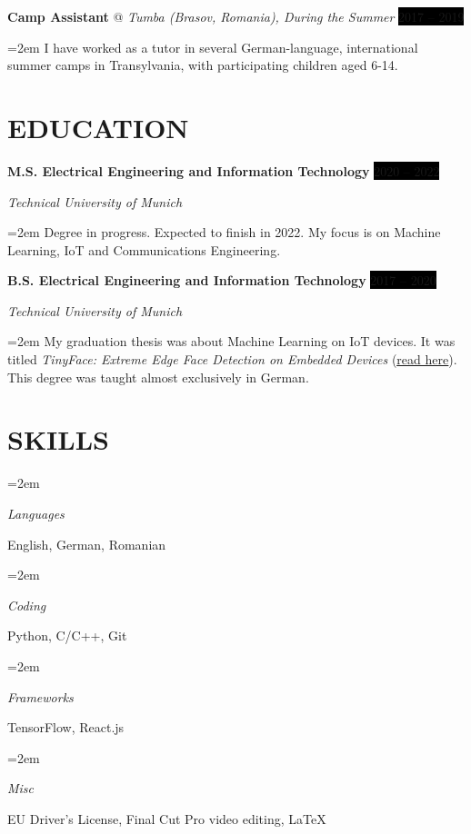 \documentclass[paper=a4,fontsize=11pt]{scrartcl}
\makeatletter
\newlength{\spacebox}
\newcommand{\sepspace}{\vspace*{0.45em}}		%
\newcommand{\NewPart}[1]{\section*{\uppercase{#1}}}
\newcommand{\PersonalEntry}[2]{
		\noindent\hangindent=2em\hangafter=0 %
		\parbox{\spacebox}{        %
		\textit{#1}}		       %
		\hspace{1.5em} #2 \par}    %
\newcommand{\SkillsEntry}[2]{      %
		\noindent\hangindent=2em\hangafter=0 %
		\parbox{\spacebox}{        %
		\textit{#1}}			   %
		\hspace{2.5em} #2 \par}    %
\newcommand{\EducationEntry}[4]{
		\noindent \textbf{#1} \hfill      %
		\colorbox{Black}{\color{White}#2} \par  %
		\noindent \textit{#3} \par        %
		\noindent\hangindent=2em\hangafter=0 \small #4 %
		\normalsize \par}
\newcommand{\WorkEntry}[4]{				  %
		\noindent \textbf{#1} @ \textit{#3} \hfill      %
		\colorbox{Black}{\color{White}#2} \par  %
		\noindent\hangindent=2em\hangafter=0 \small #4 %
		\normalsize \par}
\makeatother
\begin{document}
\WorkEntry{Camp Assistant}{2017 – 2019}{Tumba (Brasov, Romania), During the Summer}{I have worked as a tutor in several German-language, international summer camps in Transylvania, with participating children aged 6-14.}

\NewPart{Education}{}

\EducationEntry{M.S. Electrical Engineering and Information Technology}{2020 – 2022}{Technical University of Munich}{Degree in progress. Expected to finish in 2022. My focus is on Machine Learning, IoT and Communications Engineering.}
\sepspace

\EducationEntry{B.S. Electrical Engineering and Information Technology}{2017 – 2020}{Technical University of Munich}{My graduation thesis was about Machine Learning on IoT devices. It was titled \textit{TinyFace: Extreme Edge Face Detection on Embedded Devices} (\href{https://github.com/munober/thesis/blob/master/digital_edition.pdf}{\underline{read here}}). This degree was taught almost exclusively in German.}

\NewPart{Skills}{}

\SkillsEntry{Languages}{English, German, Romanian}
\SkillsEntry{Coding}{Python, \textsc{C/C++}, Git}
\SkillsEntry{Frameworks}{TensorFlow, React.js}
\SkillsEntry{Misc}{EU Driver's License, Final Cut Pro video editing, \LaTeX}


\end{document}
